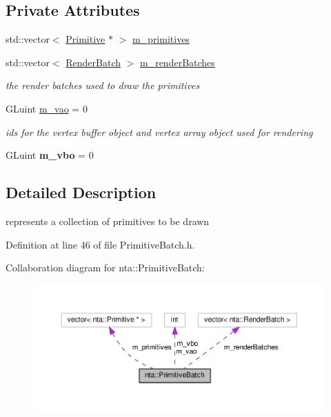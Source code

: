 \subsection*{Private Attributes}
\begin{DoxyCompactItemize}
\item 
std\+::vector$<$ \hyperlink{structnta_1_1Primitive}{Primitive} $\ast$ $>$ \hyperlink{classnta_1_1PrimitiveBatch_a85b1ab0111c7d02d5899f47fe1946c4f}{m\+\_\+primitives}
\item 
\mbox{\label{classnta_1_1PrimitiveBatch_a3abb09d0693913206ed7e580827d6fd7}} 
std\+::vector$<$ \hyperlink{structnta_1_1RenderBatch}{Render\+Batch} $>$ \hyperlink{classnta_1_1PrimitiveBatch_a3abb09d0693913206ed7e580827d6fd7}{m\+\_\+render\+Batches}
\begin{DoxyCompactList}\small\item\em the render batches used to draw the primitives \end{DoxyCompactList}\item 
\mbox{\label{classnta_1_1PrimitiveBatch_aa2d837d036dd9f57145870546f7514e6}} 
G\+Luint \hyperlink{classnta_1_1PrimitiveBatch_aa2d837d036dd9f57145870546f7514e6}{m\+\_\+vao} = 0
\begin{DoxyCompactList}\small\item\em ids for the vertex buffer object and vertex array object used for rendering \end{DoxyCompactList}\item 
\mbox{\label{classnta_1_1PrimitiveBatch_a2ba3a776569269877d67e8754ca68db2}} 
G\+Luint {\bfseries m\+\_\+vbo} = 0
\end{DoxyCompactItemize}


\subsection{Detailed Description}
represents a collection of primitives to be drawn 

Definition at line 46 of file Primitive\+Batch.\+h.



Collaboration diagram for nta\+:\+:Primitive\+Batch\+:\nopagebreak
\begin{figure}[H]
\begin{center}
\leavevmode
\includegraphics[width=350pt]{de/d68/classnta_1_1PrimitiveBatch__coll__graph}
\end{center}
\end{figure}


